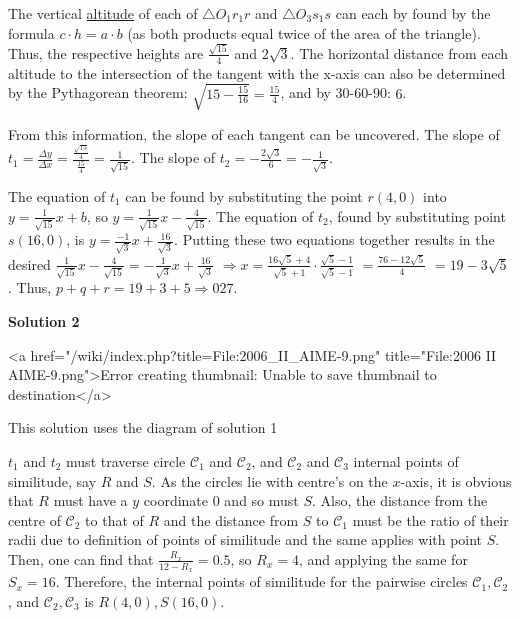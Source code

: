 \begin{enumerate}
 The vertical \href{https://artofproblemsolving.com/wiki/index.php?title=Altitude}{altitude} of each of $\triangle O_1r_1r$ and $\triangle O_3s_1s$ can each by found by the formula $c \cdot h = a \cdot b$ (as both products equal twice of the area of the triangle). Thus, the respective heights are $\frac{\sqrt{15}}{4}$ and $2\sqrt{3}$. The horizontal distance from each altitude to the intersection of the tangent with the x-axis can also be determined by the Pythagorean theorem: $\sqrt{15 - \frac{15}{16}} = \frac{15}{4}$, and by 30-60-90: $6$. 

 From this information, the slope of each tangent can be uncovered. The slope of $t_1 = \frac{\Delta y}{\Delta x} = \frac{\frac{\sqrt{15}}{4}}{\frac{15}{4}} = \frac{1}{\sqrt{15}}$. The slope of $t_2 = -\frac{2\sqrt{3}}{6} = -\frac{1}{\sqrt{3}}$.

 The equation of $t_1$ can be found by substituting the point $r (4,0)$ into $y = \frac{1}{\sqrt{15}}x + b$, so $y = \frac{1}{\sqrt{15}}x - \frac{4}{\sqrt{15}}$. The equation of $t_2$, found by substituting point $s (16,0)$, is $y = \frac{-1}{\sqrt{3}}x + \frac{16}{\sqrt{3}}$. Putting these two equations together results in the desired $\frac{1}{\sqrt{15}}x - \frac{4}{\sqrt{15}} = -\frac{1}{\sqrt{3}}x + \frac{16}{\sqrt{3}}$ $\Longrightarrow x = \frac{16\sqrt{5} + 4}{\sqrt{5} + 1} \cdot \frac{\sqrt{5}-1}{\sqrt{5}-1}$ $= \frac{76 - 12\sqrt{5}}{4}$ $= 19 - 3\sqrt{5}$. Thus, $p + q + r = 19 + 3 + 5 \Longrightarrow \boxed{027}$.

 



\textbf{Solution 2}

<a href="/wiki/index.php?title=File:2006\_II\_AIME-9.png" title="File:2006 II AIME-9.png">Error creating thumbnail: Unable to save thumbnail to destination</a>

 This solution uses the diagram of solution 1

 $t_1$ and $t_2$ must traverse circle $\mathcal{C}_1$ and $\mathcal{C}_2$, and $\mathcal{C}_2$ and $\mathcal{C}_3$ internal points of similitude, say $R$ and $S$. As the circles lie with centre's on the $x$-axis, it is obvious that $R$ must have a $y$ coordinate 0 and so must $S$. Also, the distance from the centre of $\mathcal{C}_2$ to that of $R$ and the distance from $S$ to $\mathcal{C}_1$ must be the ratio of their radii due to definition of points of similitude and the same applies with point $S$. Then, one can find that $\frac{R_x}{12-R_x} = 0.5$, so $R_x = 4$, and applying the same for $S_x = 16$. Therefore, the internal points of similitude for the pairwise circles $\mathcal{C}_1, \mathcal{C}_2$, and $\mathcal{C}_2, \mathcal{C}_3$ is $R(4,0), S(16,0)$.


\end{enumerate}
